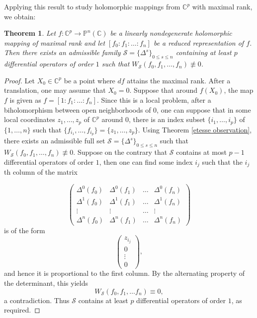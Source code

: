 \documentclass[english, 12pt]{amsart}
\theoremstyle{plain}
\newtheorem{thm}{Theorem}[section]
\theoremstyle{remark}
\numberwithin{equation}{section}
\theoremstyle{plain}
\theoremstyle{named}
\begin{document}
Applying this result to study holomorphic mappings from $\mathbb{C}^p$ with maximal rank, we obtain:
\begin{thm}
	\label{generalized wronskian for maximal rank holo mapping Cp to CPn}
Let $f\colon\mathbb{C}^p\rightarrow\mathbb{P}^n(\mathbb{C})$ be a linearly nondegenerate holomorphic mapping of maximal rank and let $[f_0:f_1:\dots:f_n]$ be a reduced representation of $f$. Then there exists an admissible family $\mathcal{S}=\{\Delta^s\}_{0\leq s\leq n}$ containing at least $p$ differential operators of order $1$ such that $W_{\mathcal{S}}(f_0,f_1,\dots,f_n)\not\equiv 0$. 
\end{thm}
\begin{proof}
	Let $X_0\in\mathbb{C}^p$ be a point where $df$ attains the maximal rank. After a translation, one may assume that $X_0=0$. Suppose that around $f(X_0)$, the map $f$ is given as $f=[1:f_1:\dots:f_n]$. Since this is a local problem, after a biholomorphism between  open neighborhoods of $0$, one can suppose that in some local coordinates $z_1,\dots,z_p$ of $\mathbb{C}^p$ around $0$, there is an index subset $\{i_1,\dots,i_p\}$ of $\{1,\dots,n\}$ such that $\{f_{i_1},\dots,f_{i_p}\}=\{z_1,\dots,z_p\}$. Using Theorem \ref{etesse observation}, there exists an admissible full set $\mathcal{S}=\{\Delta^s\}_{0\leq s\leq n}$ such that $W_{\mathcal{S}}(f_0,f_1,\dots,f_n)\not\equiv 0$. Suppose on the contrary that $\mathcal{S}$ contains at most $p-1$ differential operators of order $1$, then one can find some index $i_j$  such that the $i_j$th column of the matrix

$$ \begin{pmatrix}
	\Delta^0 (f_0)&\Delta^0({f_1})&\dots&\Delta^0(f_n)\\
	\Delta^1(f_0)&\Delta^1(f_1)&\dots&\Delta^1(f_n)\\
	\vdots&\vdots&\dots&\vdots\\
	\Delta^n(f_0)&\Delta^n(f_1)&\dots&\Delta^n(f_n)
\end{pmatrix}$$
is of the form
$$
 \begin{pmatrix}
z_{i_j}\\
0\\
\vdots\\
0
\end{pmatrix},
$$
and hence it is proportional to the first column. By the alternating property of the determinant, this yields $$
W_{\mathcal{S}}(f_0,f_1,\dots f_n)\equiv 0,
$$
a contradiction. Thus  $\mathcal{S}$ contains at least $p$ differential operators of order $1$, as required.
\end{proof}
\end{document}
